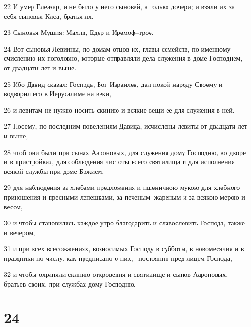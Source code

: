 \par 22 И умер Елеазар, и не было у него сыновей, а только дочери; и взяли их за себя сыновья Киса, братья их.
\par 23 Сыновья Мушия: Махли, Едер и Иремоф--трое.
\par 24 Вот сыновья Левиины, по домам отцов их, главы семейств, по именному счислению их поголовно, которые отправляли дела служения в доме Господнем, от двадцати лет и выше.
\par 25 Ибо Давид сказал: Господь, Бог Израилев, дал покой народу Своему и водворил его в Иерусалиме на веки,
\par 26 и левитам не нужно носить скинию и всякие вещи ее для служения в ней.
\par 27 Посему, по последним повелениям Давида, исчислены левиты от двадцати лет и выше,
\par 28 чтоб они были при сынах Аароновых, для служения дому Господню, во дворе и в пристройках, для соблюдения чистоты всего святилища и для исполнения всякой службы при доме Божием,
\par 29 для наблюдения за хлебами предложения и пшеничною мукою для хлебного приношения и пресными лепешками, за печеным, жареным и за всякою мерою и весом,
\par 30 и чтобы становились каждое утро благодарить и славословить Господа, также и вечером,
\par 31 и при всех всесожжениях, возносимых Господу в субботы, в новомесячия и в праздники по числу, как предписано о них, --постоянно пред лицем Господа,
\par 32 и чтобы охраняли скинию откровения и святилище и сынов Аароновых, братьев своих, при службах дому Господню.

\chapter{24}

